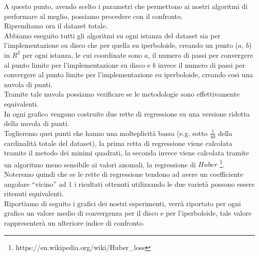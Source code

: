 \documentclass[a4paper, 12pt]{article}
\begin{document}
A questo punto, avendo scelto i parametri che permettono ai nostri algoritmi di performare al meglio, possiamo procedere con il confronto.\\
Riprendiamo ora il dataset totale.\\
Abbiamo eseguito tutti gli algoritmi su ogni istanza del dataset sia per l'implementazione su disco che per quella su iperboloide, creando un punto  ($a$, $b$) in $R^2$ per ogni istanza, le cui coordinate sono $a$, il numero di passi per convergere al punto limite per l'implementazione su disco e $b$ invece il numero di passi per convergere al punto limite per l'implementazione su iperboloide, creando cosi una nuvola di punti.\\
Tramite tale nuvola possiamo verificare se le metodologie sono effettivamente equivalenti.\\
In ogni grafico vengono costruite due rette di regressione su una versione ridotta della nuvola di punti.\\
Toglieremo quei punti che hanno una molteplicità bassa (e.g. sotto $\frac{1}{40}$ della cardinalità totale del dataset), la prima retta di regressione viene calcolata tramite il metodo dei minimi quadrati, la seconda invece viene calcolata tramite un algoritmo meno sensibile ai valori anomali, la regressione di $Huber$ \footnote{https://en.wikipedia.org/wiki/Huber\_loss}. Noteremo quindi che se le rette di regressione tendono ad avere un coefficiente angolare ``vicino'' ad $1$ i risultati ottenuti utilizzando le due varietà possono essere ritenuti equivalenti.\\
Riportiamo di seguito i grafici dei nostri esperimenti, verrà riportato per ogni grafico un valore medio di convergenza per il disco e per l'iperboloide, tale valore rappresenterà un ulteriore indice di confronto.\\
\newpage
\end{document}
